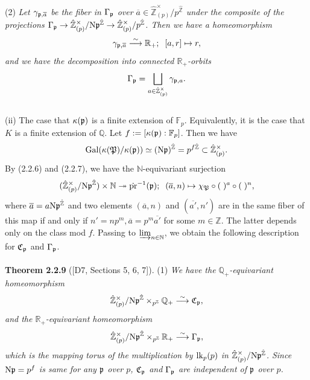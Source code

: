 \documentclass[12pt, leqno]{article}
\begin{document}
 (2)   {\it  Let $\gamma_{\frak{p}, \overline{a}}$ be the fiber in $\Gamma_{\frak{p}}$ over $\overline{a} \in \hat{\mathbb{Z}}_{(p)}^{\times}/p^{\hat{\mathbb{Z}}}$  under the composite of the projections $\Gamma_{\frak{p}} \rightarrow  \hat{\mathbb{Z}}_{(p)}^{\times}/{\rm N}\frak{p}^{\hat{\mathbb{Z}}} \rightarrow \hat{\mathbb{Z}}_{(p)}^{\times}/p^{\hat{\mathbb{Z}}}$.    Then we have a homeomorphism}
 $$ \gamma_{\frak{p}, \overline{a}} \stackrel{\sim}{\longrightarrow} \mathbb{R}_+; \; \; [a, r] \mapsto r,$$
{\it and we have the decomposition into connected $\mathbb{R}_+$-orbits}
$$\Gamma_{\frak{p}} = \bigsqcup_{a \in \hat{\mathbb{Z}}_{(p)}^{\times}} \gamma_{\frak{p},a}.$$ 
\\
(ii) The case that $\kappa(\frak{p})$ is a finite extension of $\mathbb{F}_p$. Equivalently, it is the case that $K$ is a finite extension of $\mathbb{Q}$. Let $f := [\kappa(\frak{p}):\mathbb{F}_p]$. Then we have
$${\rm Gal}(\kappa(\frak{P})/\kappa(\frak{p})) \simeq ({\rm N}\frak{p})^{\hat{\mathbb{Z}}} = p^{f\hat{\mathbb{Z}}} \subset \hat{\mathbb{Z}}_{(p)}^{\times}.$$
 By (2.2.6) and (2.2.7), we have the $\mathbb{N}$-equivariant surjection
 $$ (\hat{\mathbb{Z}}_{(p)}^{\times}/{\rm N}\frak{p}^{\hat{\mathbb{Z}}}) \times \mathbb{N}  \twoheadrightarrow \dot{\rm pr}^{-1}(\frak{p});
 \;\; (\overline{a}, n) \mapsto \chi_{\frak{P}}\circ (\; )^{a} \circ (\; )^n, $$
where $\overline{a} = a {\rm N}\frak{p}^{\hat{\mathbb{Z}}}$ and two elements $(\overline{a},n)$ and $(\overline{a'},n')$ are in the same fiber of this map if and only if $n' = np^m, \overline{a} = p^m \overline{a'}$ for some $m \in \mathbb{Z}$. The latter  depends only on the class mod $f$. Passing to $\varinjlim_{n \in \mathbb{N}}$, we obtain the following  description for $\frak{C}_{\frak{p}}$ and $\Gamma_{\frak{p}}$. \\
\\
{\bf Theorem 2.2.9} ([D7, Sections 5, 6, 7]). (1) {\it We have the $\mathbb{Q}_+$-equivariant homeomorphism
$$ \hat{\mathbb{Z}}_{(p)}^{\times}/{\rm N}\frak{p}^{\hat{\mathbb{Z}}} \times_{p^{\mathbb{Z}}} \mathbb{Q}_+   \stackrel{\sim}{\longrightarrow} \frak{C}_{\frak{p}},$$
and  the $\mathbb{R}_+$-equivariant homeomorphism
$$ \hat{\mathbb{Z}}_{(p)}^{\times}/{\rm N}\frak{p}^{\hat{\mathbb{Z}}}  \times_{p^{\mathbb{Z}}}  \mathbb{R}_+   \stackrel{\sim}{\longrightarrow} \Gamma_{\frak{p}},$$
which is  the mapping torus of the multiplication by ${\rm lk}_p(p)$ in $\hat{\mathbb{Z}}_{(p)}^{\times}/{\rm N}\frak{p}^{\hat{\mathbb{Z}}}$. 
Since ${\rm N}\frak{p} = p^f$ is same for any $\frak{p}$ over $p$, $\frak{C}_{\frak{p}}$ and $\Gamma_{\frak{p}}$ are independent of $\frak{p}$ over $p$.}\\
\end{document}
